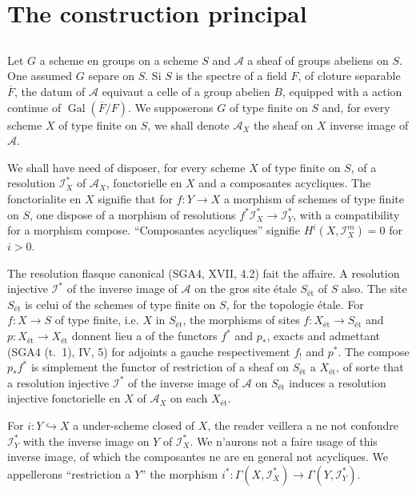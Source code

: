 \documentclass[11pt,a4paper]{article}
\theoremstyle{plain}
\theoremstyle{definition}
\DeclareMathOperator{\Gal}{Gal}
\newcommand{\et}{\text{\'et}}
\begin{document}
\section{The construction principal}

\subsection{}\label{2.1}

Let $G$ a scheme en groups on a scheme $S$ and $\mathscr{A}$ a sheaf of groups abeliens on $S$. One assumed $G$ separe on $S$. Si $S$ is the spectre of a field $F$, of cloture separable $\overline{F}$, the datum of $\mathscr{A}$ equivaut a celle of a group abelien $B$, equipped with a action continue of $\Gal(\overline{F}/F)$. We supposerons $G$ of type finite on $S$ and, for every scheme $X$ of type finite on $S$, we shall denote $\mathscr{A}_X$ the sheaf on $X$ inverse image of $\mathscr{A}$.

We shall have need of disposer, for every scheme $X$ of type finite on $S$, of a resolution $\mathscr{I}_X^*$ of $\mathscr{A}_X$, fonctorielle en $X$ and a composantes acycliques. The fonctorialite en $X$ signifie that for $f : Y \to X$ a morphism of schemes of type finite on $S$, one dispose of a morphism of resolutions $f^* \mathscr{I}_X^* \to \mathscr{I}_Y^*$, with a compatibility for a morphism compose. ``Composantes acycliques'' signifie $H^i(X, \mathscr{I}_X^m) = 0$ for $i > 0$.

The resolution flasque canonical (SGA4, XVII, 4.2) fait the affaire. A resolution injective $\mathscr{I}^*$ of the inverse image of $\mathscr{A}$ on the gros site étale $S_{\et}$ of $S$ also. The site $S_{\et}$ is celui of the schemes of type finite on $S$, for the topologie étale. For $f : X \to S$ of type finite, i.e. $X$ in $S_{\et}$, the morphisms of sites $f : X_{\et} \to S_{\et}$ and $p : X_{\et} \to X_{\et}$ donnent lieu a of the functors $f^*$ and $p_*$, exacts and admettant (SGA4 (t.~1), IV, 5) for adjoints a gauche respectivement $f_!$ and $p^*$. The compose $p_* f^*$ is simplement the functor of restriction of a sheaf on $S_{\et}$ a $X_{\et}$, of sorte that a resolution injective $\mathscr{I}^*$ of the inverse image of $\mathscr{A}$ on $S_{\et}$ induces a resolution injective fonctorielle en $X$ of $\mathscr{A}_X$ on each $X_{\et}$.

For $i : Y \hookrightarrow X$ a under-scheme closed of $X$, the reader veillera a ne not confondre $\mathscr{I}_Y^*$ with the inverse image on $Y$ of $\mathscr{I}_X^*$. We n'aurons not a faire usage of this inverse image, of which the composantes ne are en general not acycliques. We appellerons ``restriction a $Y$'' the morphism $i^* : \Gamma(X, \mathscr{I}_X^*) \to \Gamma(Y, \mathscr{I}_Y^*)$.
\end{document}
